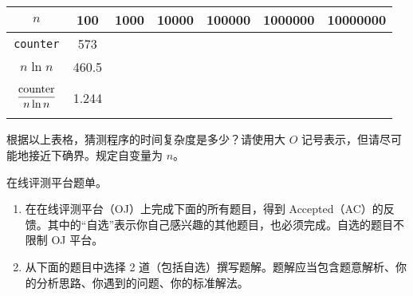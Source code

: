 \begin{problemset}
\begin{enumerate}
		\begin{table}[H]
			\centering
			\begin{tabular}{|c|c|c|c|c|c|c|}
				\hline
				$n$ & 100 & 1000 & 10000 & 100000 & 1000000 & 10000000
				\\\hline
				\lstinline$counter$ & 573 & \phantom{8053} & \phantom{103643} & \phantom{1266714} & \phantom{14969985} & \phantom{172725300}
				\\\hline
				$n \ln n$ & 460.5 & \phantom{6907.8} & \phantom{92103.4} & \phantom{1151292.5} & \phantom{13815510.6} & \phantom{161180956.5}
				\\\hline
				$\phantom{\Biggl|} \dfrac{\text{\lstinline$counter$}}{n \ln n} \phantom{\Biggr|}$ & 1.244 & \phantom{1.166} & \phantom{1.125} & \phantom{1.100} & \phantom{1.084} & \phantom{1.072}
				\\\hline
			\end{tabular}
		\end{table}

		根据以上表格，猜测程序的时间复杂度是多少？请使用大 $O$ 记号表示，但请尽可能地接近下确界。规定自变量为 $n$。
	\end{enumerate}

	\item 在线评测平台题单。

	\begin{enumerate}
		\item 在在线评测平台（OJ）上完成下面的所有题目，得到 Accepted（AC）的反馈。其中的“自选”表示你自己感兴趣的其他题目，也必须完成。自选的题目不限制 OJ 平台。
		\item 从下面的题目中选择 2 道（包括自选）撰写题解。题解应当包含题意解析、你的分析思路、你遇到的问题、你的标准解法。
	\end{enumerate}


\end{problemset}
